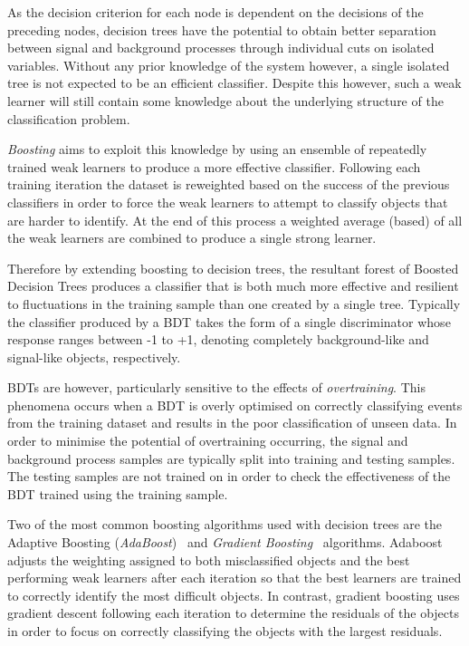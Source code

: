 As the decision criterion for each node is dependent on the decisions of the preceding nodes, decision trees have the potential to obtain better separation between signal and background processes through individual cuts on isolated variables.
Without any prior knowledge of the system however, a single isolated tree is not expected to be an efficient classifier.
Despite this however, such a weak learner will still contain some knowledge about the underlying structure of the classification problem.

\emph{Boosting} aims to exploit this knowledge by using an ensemble of repeatedly trained weak learners to produce a more effective classifier.
Following each training iteration the dataset is reweighted based on the success of the previous classifiers in order to force the weak learners to attempt to classify objects that are harder to identify.
At the end of this process a weighted average (based) of all the weak learners are combined to produce a single strong learner.

Therefore by extending boosting to decision trees, the resultant forest of Boosted Decision Trees produces a classifier that is both much more effective and resilient to fluctuations in the training sample than one created by a single tree.
Typically the classifier produced by a BDT takes the form of a single discriminator whose response ranges between -1 to +1, denoting completely background-like and signal-like objects, respectively.

BDTs are however, particularly sensitive to the effects of \emph{overtraining}.
This phenomena occurs when a BDT is overly optimised on correctly classifying events from the training dataset and results in the poor classification of unseen data.
In order to minimise the potential of overtraining occurring, the signal and background process samples are typically split into training and testing samples.
The testing samples are not trained on in order to check the effectiveness of the BDT trained using the training sample.

Two of the most common boosting algorithms used with decision trees are the Adaptive Boosting (\emph{AdaBoost})~\cite{Friedman:additivelogistic} and \emph{Gradient Boosting}~\cite{Friedman:greedyfunction,Friedman:GradientBoosting} algorithms.
Adaboost adjusts the weighting assigned to both  misclassified objects and the best performing weak learners after each iteration so that the best learners are trained to correctly identify the most difficult objects.
In contrast, gradient boosting uses gradient descent following each iteration to determine the residuals of the objects in order to focus on correctly classifying the objects with the largest residuals.

